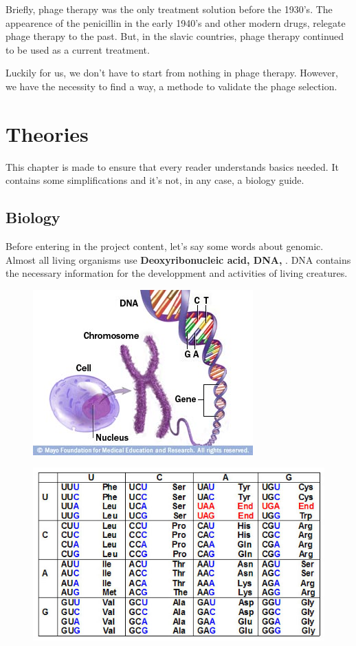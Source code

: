 \documentclass[a4paper,11pt]{report}
\begin{document}
Briefly, phage therapy was the only treatment solution before the 1930's. The appearence of the penicillin in the early 1940's and other modern drugs, relegate phage therapy to the past. But, in the slavic countries, phage therapy continued to be used as a current treatment.

Luckily for us, we don't have to start from nothing in phage therapy. However, we have the necessity to find a way, a methode to validate the phage selection. \cite{ref2}


\chapter{Theories}
This chapter is made to ensure that every reader understands basics needed. It contains some simplifications and it's not, in any case, a biology guide.
\vspace{-0.6cm}
\section{Biology}
Before entering in the project content, let's say some words about genomic. Almost all living organisms use \textbf{Deoxyribonucleic acid, DNA,} \cite{ref9}. DNA contains the necessary information for the developpment and activities of living creatures.

\begin{figure}[H]
\centering
\begin{minipage}{.5\textwidth}
  \centering
  \includegraphics[width=.8\linewidth]{img/chromosome}
  \label{fig:test1}
\end{minipage}%
\begin{minipage}{.5\textwidth}
  \centering
  \includegraphics[width=.7\linewidth]{img/geneticcode}
  \label{fig:test2}
\end{minipage}
\end{figure}
\end{document}
